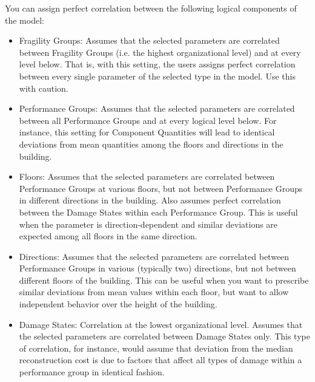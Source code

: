 You can assign perfect correlation between the following logical components of the model:
\begin{itemize}
	\item Fragility Groups: Assumes that the selected parameters are correlated between Fragility Groups (i.e. the highest organizational level) and at every level below. That is, with this setting, the users assigns perfect correlation between every single parameter of the selected type in the model. Use this with caution.
	\item Performance Groups: Assumes that the selected parameters are correlated between all Performance Groups and at every logical level below. For instance, this setting for Component Quantities will lead to identical deviations from mean quantities among the floors and directions in the building.
	\item Floors: Assumes that the selected parameters are correlated between Performance Groups at various floors, but not between Performance Groups in different directions in the building. Also assumes perfect correlation between the Damage States within each Performance Group. This is useful when the parameter is direction-dependent and similar deviations are expected among all floors in the same direction.
	\item Directions: Assumes that the selected parameters are correlated between Performance Groups in various (typically two) directions, but not between different floors of the building. This can be useful when you want to prescribe similar deviations from mean values within each floor, but want to allow independent behavior over the height of the building.
	\item Damage States: Correlation at the lowest organizational level. Assumes that the selected parameters are correlated between Damage States only. This type of correlation, for instance, would assume that deviation from the median reconstruction cost is due to factors that affect all types of damage within a performance group in identical fashion.
\end{itemize}

